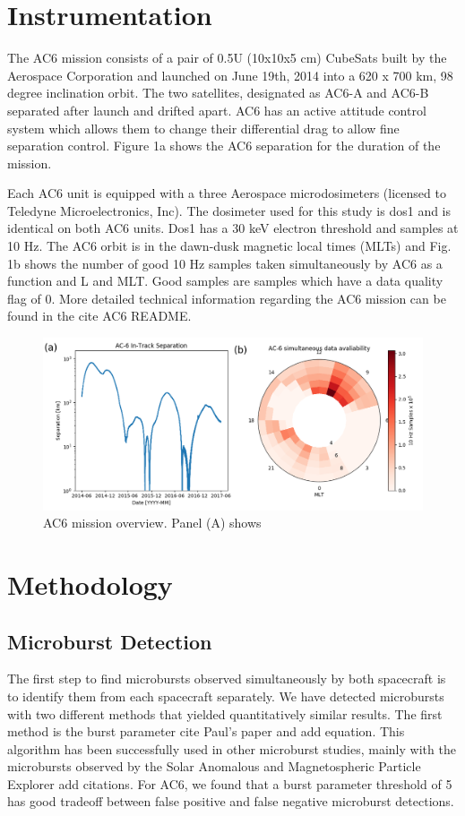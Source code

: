 \documentclass[draft]{agujournal2019}
\begin{document}
\section{Instrumentation}
The AC6 mission consists of a pair of 0.5U (10x10x5 cm) CubeSats built by the Aerospace Corporation and launched on June 19th, 2014 into a 620 x 700 km, 98 degree inclination orbit. The two satellites, designated as AC6-A and AC6-B separated after launch and drifted apart. AC6 has an active attitude control system which allows them to change their differential drag to allow fine separation control. Figure 1a shows the AC6 separation for the duration of the mission.

Each AC6 unit is equipped with a three Aerospace microdosimeters (licensed to Teledyne Microelectronics, Inc). The dosimeter used for this study is dos1 and is identical on both AC6 units. Dos1 has a 30 keV electron threshold and samples at 10 Hz. The AC6 orbit is in the dawn-dusk magnetic local times (MLTs) and Fig. 1b shows the number of good 10 Hz samples taken simultaneously by AC6 as a function and L and MLT. Good samples are samples which have a data quality flag of 0. More detailed technical information regarding the AC6 mission can be found in the cite AC6 README.

\begin{figure}
\includegraphics[width=\textwidth]{fig1.png}
\caption{AC6 mission overview. Panel (A) shows } \label{fig1}
\end{figure}

\section{Methodology}
\subsection{Microburst Detection}
The first step to find microbursts observed simultaneously by both spacecraft is to identify them from each spacecraft separately. We have detected microbursts with two different methods that yielded quantitatively similar results. The first method is the burst parameter cite Paul’s paper and add equation. This algorithm has been successfully used in other microburst studies, mainly with the microbursts observed by the Solar Anomalous and Magnetospheric Particle Explorer add citations. For AC6, we found that a burst parameter threshold of 5 has good tradeoff between false positive and false negative microburst detections.
\end{document}
